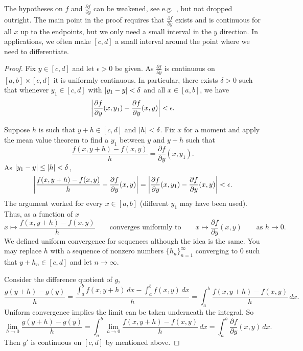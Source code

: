 The hypotheses on $f$ and $\frac{\partial f}{\partial y}$ can be
weakened, see e.g.\ ,
but not dropped outright.
The main point in the proof requires that
$\frac{\partial f}{\partial y}$ exists and is continuous for all $x$
up to the endpoints, but we only need a small
interval in the $y$ direction.  In applications, we often make $[c,d]$ a
small interval around the point where we need to differentiate.

\begin{proof}
Fix $y \in [c,d]$ and let $\epsilon > 0$ be given.
As $\frac{\partial f}{\partial y}$ is continuous on $[a,b] \times [c,d]$ it
is uniformly continuous.  In particular, there exists $\delta > 0$ such that
whenever $y_1 \in [c,d]$ with
$\left\lvert {y_1-y} \right\rvert < \delta$ and all $x \in [a,b]$, we have
\begin{equation*}
\left\lvert {\frac{\partial f}{\partial y}(x,y_1)-\frac{\partial f}{\partial y}(x,y)} \right\rvert < \epsilon .
\end{equation*}

Suppose $h$ is such that $y+h \in [c,d]$ and $\left\lvert {h} \right\rvert < \delta$.
Fix $x$ for a moment
and apply the mean value theorem to find a $y_1$ between $y$ and $y+h$ such that
\begin{equation*}
\frac{f(x,y+h)-f(x,y)}{h}
=
\frac{\partial f}{\partial y}(x,y_1) .
\end{equation*}
As $\left\lvert {y_1-y} \right\rvert \leq \left\lvert {h} \right\rvert < \delta$,
\begin{equation*}
\left\lvert {
\frac{f(x,y+h)-f(x,y)}{h}
-
\frac{\partial f}{\partial y}(x,y) 
} \right\rvert
=
\left\lvert {
\frac{\partial f}{\partial y}(x,y_1) 
-
\frac{\partial f}{\partial y}(x,y) 
} \right\rvert
< \epsilon .
\end{equation*}
The argument worked for every $x \in [a,b]$ (different $y_1$ may have been
used).  Thus, as a function of
$x$
\begin{equation*}
x \mapsto \frac{f(x,y+h)-f(x,y)}{h}
\qquad
\text{converges uniformly to}
\qquad
x \mapsto \frac{\partial f}{\partial y}(x,y)
\qquad
\text{as } h \to 0 .
\end{equation*}
We defined uniform convergence for sequences although the idea is the
same.  You may replace $h$ with a sequence of nonzero 
numbers $\{ h_n \}_{n=1}^\infty$
converging to $0$ such that $y+h_n \in [c,d]$ and let $n \to \infty$.

Consider the difference quotient of $g$,
\begin{equation*}
\frac{g(y+h)-g(y)}{h}
=
\frac{\int_a^b f(x,y+h) \,dx -
\int_a^b f(x,y) \,dx }{h}
=
\int_a^b \frac{f(x,y+h)-f(x,y)}{h} \,dx .
\end{equation*}
Uniform convergence implies the limit can be taken underneath the integral.
So
\begin{equation*}
\lim_{h\to 0}
\frac{g(y+h)-g(y)}{h}
= 
\int_a^b 
\lim_{h\to 0}
\frac{f(x,y+h)-f(x,y)}{h} \,dx 
=
\int_a^b 
\frac{\partial f}{\partial y}(x,y) \,dx .
\end{equation*}
Then $g'$ is continuous on $[c,d]$ by
 mentioned above.
\end{proof}

